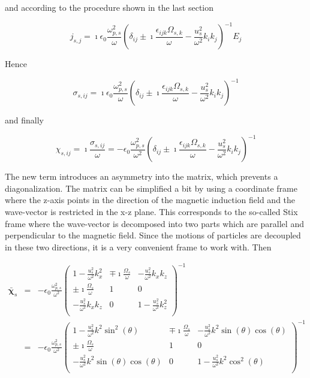 \documentclass[a4paper,11pt]{thesis}
\begin{document}
and according to the procedure shown in the last section

\begin{equation}
   j_{s,j} = \imath \epsilon_0 \frac{\omega_{p,s}^2}{  \omega} \left( \delta_{ij} \pm \imath
    \frac{  \epsilon_{ijk} \Omega_{s,k}}{\omega} -  \frac{u_s^2 }{  \omega^2} k_ik_j \right)^{-1} E_j
\end{equation}

Hence

\begin{equation}
   \sigma_{s,ij} = \imath \epsilon_0 \frac{\omega_{p,s}^2}{  \omega} \left( \delta_{ij} \pm \imath
    \frac{  \epsilon_{ijk} \Omega_{s,k}}{\omega} -  \frac{u_s^2 }{  \omega^2} k_ik_j \right)^{-1}
\end{equation}

and finally

\begin{equation}
   \chi_{s,ij} =\imath \frac{\sigma_{s,ij}}{\omega} = - \epsilon_0 \frac{\omega_{p,s}^2}{  \omega^2} \left( \delta_{ij} \pm \imath
    \frac{  \epsilon_{ijk} \Omega_{s,k}}{\omega} -  \frac{u_s^2 }{  \omega^2} k_ik_j \right)^{-1}
\end{equation}

The new term introduces an asymmetry into the matrix, which prevents a diagonalization. The matrix can be simplified a bit by using a coordinate frame where the z-axis points in the direction of the magnetic induction field and the wave-vector is restricted in the x-z plane. This corresponds to the so-called Stix frame where the wave-vector is decomposed into two parts which are parallel and perpendicular to the magnetic field. Since the motions of particles are decoupled in these two directions, it is a very convenient frame to work with. Then

\begin{eqnarray}
   \mathbf{\bar{\chi}}_s &=& - \epsilon_0 \frac{\omega_{p,s}^2}{  \omega^2} \left(%
\begin{array}{ccc}
  1 -  \frac{u_s^2 }{  \omega^2}k_x^2& \mp \imath \frac{  \Omega_s}{\omega}  & -  \frac{u_s^2 }{  \omega^2}k_x k_z \\
  \pm \imath \frac{  \Omega_s}{\omega} & 1 & 0 \\
  -  \frac{u_s^2 }{  \omega^2}k_x k_z & 0 & 1-  \frac{u_s^2 }{  \omega^2}k_z^2 \\
\end{array}%
\right)^{-1}\\
&=& - \epsilon_0 \frac{\omega_{p,s}^2}{  \omega^2} \left(%
\begin{array}{ccc}
  1 -  \frac{u_s^2 }{  \omega^2}k^2 \sin^2(\theta)& \mp \imath \frac{  \Omega_s}{\omega}  & -  \frac{u_s^2 }{  \omega^2}k^2 \sin(\theta)\cos(\theta) \\
  \pm \imath \frac{  \Omega_s}{\omega} & 1 & 0 \\
  -  \frac{u_s^2 }{  \omega^2}k^2 \sin(\theta)\cos(\theta) & 0 & 1-  \frac{u_s^2 }{  \omega^2}k^2 \cos^2(\theta) \\
\end{array}%
\right)^{-1}\nonumber
\end{eqnarray}
\end{document}
